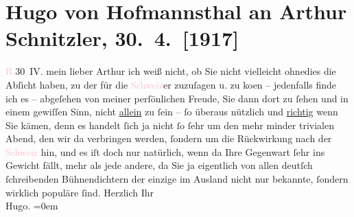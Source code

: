 

               \section[Hugo von Hofmannsthal an Arthur Schnitzler, 30. 4. {[}1917{]}]{ Hugo von Hofmannsthal an Arthur Schnitzler, 30. 4. {[}1917{]}}\nopagebreak{}\rehead{ }\normalsize\beginnumbering{} \toendnotes[C]{\smallbreak\pagebreak[2]} 
\toendnotes[C]{\smallbreak}\pstart
           \raggedleft{}{\pb}\textcolor{pink}{R.}{}\ledrightnote{\textcolor{pink}{Rodaun}}{ }30 IV.\pend
           \pstart{}mein lieber Arthur \pend\pstart
           ich weiß nicht, ob Sie nicht vielleicht ohnedies die Abſicht haben, zu der \label{K_L02259_1v}\label{K_L02259_1h} für die \textcolor{pink}{Schweiz}{}\ledrightnote{\textcolor{pink}{Schweiz}}er zuzuſagen u. zu ko{\geminationm}en – jedenfalls
               finde ich es – abgeſehen von meiner perſönlichen Freude, Sie dann dort zu ſehen und
               in einem gewiſſen Sinn, nicht \uline{allein} zu ſein – ſo
               überaus nützlich und \uline{richtig} wenn Sie {\pb}kämen, denn es handelt ſich ja
               nicht ſo ſehr um den mehr minder trivialen Abend, den wir da verbringen werden,
               ſondern um die Rückwirkung nach der \textcolor{pink}{Schweiz}{}\ledrightnote{\textcolor{pink}{Schweiz}} hin,
               und es iſt doch nur natürlich, wenn da Ihre Gegenwart ſehr ins Gewicht fällt, mehr
               als jede andere, da Sie ja eigentlich von allen deutſch ſchreibenden Bühnendichtern
               der einzige \introOben{}im Ausland\introOben{} nicht nur bekannte, ſondern wirklich
               populäre ſind.\pend
           \pstart
           Herzlich Ihr{\\[\baselineskip]}\spacefill\mbox{Hugo.}\pend
           \leftskip=0em{}\endnumbering{}  
      